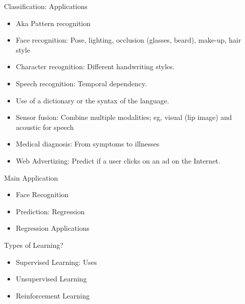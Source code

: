 \documentclass{beamer}
\begin{document}
\begin{frame}{Classification: Applications}
    \begin{itemize}
        \item Aka Pattern recognition
\item Face recognition: Pose, lighting, occlusion (glasses, beard), make-up, hair style 
\item Character recognition: Different handwriting styles.
\item Speech recognition: Temporal dependency. 
\item Use of a dictionary or the syntax of the language. 
\item Sensor fusion: Combine multiple modalities; eg, visual (lip image) and acoustic for speech
\item Medical diagnosis: From symptoms to illnesses
\item Web Advertizing: Predict if a user clicks on an ad on the Internet.
\end{itemize}
\end{frame}

\begin{frame}{Main Application}
    \begin{itemize}
        \item Face Recognition
        \item Prediction: Regression
        \item Regression Applications
    \end{itemize}
\end{frame}



\begin{frame}{Types of Learning?}
\begin{itemize}
    \item Supervised Learning: Uses
    \item Unsupervised Learning
    \item Reinforcement Learning
\end{itemize}
\end{frame}
\end{document}
